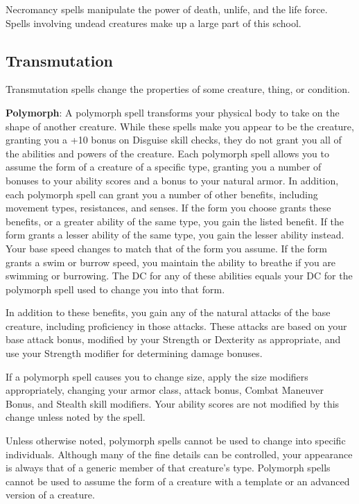				
Necromancy spells manipulate the power of death, unlife, and the life force. Spells involving undead creatures make up a large part of this school. 
				
\subsection{Transmutation}

				
Transmutation spells change the properties of some creature, thing, or condition. 
				
\textbf{Polymorph}: A polymorph spell transforms your physical body to take on the shape of another creature. While these spells make you appear to be the creature, granting you a +10 bonus on Disguise skill checks, they do not grant you all of the abilities and powers of the creature. Each polymorph spell allows you to assume the form of a creature of a specific type, granting you a number of bonuses to your ability scores and a bonus to your natural armor. In addition, each polymorph spell can grant you a number of other benefits, including movement types, resistances, and senses. If the form you choose grants these benefits, or a greater ability of the same type, you gain the listed benefit. If the form grants a lesser ability of the same type, you gain the lesser ability instead. Your base speed changes to match that of the form you assume. If the form grants a swim or burrow speed, you maintain the ability to breathe if you are swimming or burrowing. The DC for any of these abilities equals your DC for the polymorph spell used to change you into that form. 
				
In addition to these benefits, you gain any of the natural attacks of the base creature, including proficiency in those attacks. These attacks are based on your base attack bonus, modified by your Strength or Dexterity as appropriate, and use your Strength modifier for determining damage bonuses.
				
If a polymorph spell causes you to change size, apply the size modifiers appropriately, changing your armor class, attack bonus, Combat Maneuver Bonus, and Stealth skill modifiers. Your ability scores are not modified by this change unless noted by the spell.
				
Unless otherwise noted, polymorph spells cannot be used to change into specific individuals. Although many of the fine details can be controlled, your appearance is always that of a generic member of that creature's type. Polymorph spells cannot be used to assume the form of a creature with a template or an advanced version of a creature.
				

